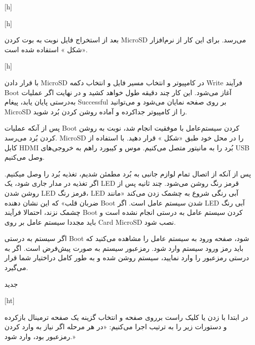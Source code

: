 [h]

[h]

بعد از استخراج فایل  ‌نوبت به بوت کردن MicroSD می‌رسد. برای این کار از نرم‌افزار  «شکل » استفاده شده است.

[h]

با قرار دادن MicroSD در کامپیوتر و انتخاب مسیر فایل و انتخاب دکمه Write فرآیند Boot آغاز می‌شود. این کار چند دقیقه طول خواهد کشید و در نهایت اگر عملیات به‌درستی پایان یابد، پیغام Successful بر روی صفحه نمایان می‌شود و می‌توانید MicroSD را از کامپیوتر جداکرده و آماده روشن کردن بُرد شوید.

پس از آنکه عملیات Boot کردن سیستم‌عامل با موفقیت انجام شد، نوبت به روشن کردن بُرد می‌رسد. MicroSD را در محل خود طبق «شکل » قرار دهید. با استفاده از کابل HDMI بُرد را به مانیتور متصل می‌کنیم. موس و کیبورد راهم به خروجی‌های USB وصل می‌کنیم.

پس از آنکه از اتصال تمام لوازم جانبی به بُرد مطمئن شدیم، تغذیه بُرد را وصل میکنیم. اگر تغذیه در مدار جاری شود، یک LED قرمز رنگ روشن می‌شود. چند ثانیه پس از روشن شدن LED قرمز رنگ، LED آبی رنگی شروع به چشمک زدن می‌کند «مانند ضربان قلب» که این نشان دهنده Boot شدن سیستم عامل است. اگر LED آبی رنگ چشمک نزند، احتمالا فرآیند Boot کردن سیستم عامل به درستی انجام نشده است و باید مجددا سیستم عامل بر روی Card MicroSD نصب شود.

اگر سیستم به درستی Boot شود، صفحه ورود به سیستم عامل را مشاهده می‌کنید که باید رمز ورود سیستم وارد شود. رمزعبور سیستم به صورت پیش‌فرض  است. اگر به درستی رمزعبور را وارد نمایید، سیستم روشن شده و به طور کامل دراختیار شما قرار می‌گیرد.

‌جدید


[ht]


در ابتدا با زدن  یا کلیک راست بر‌روی صفحه و انتخاب گزینه  یک صفحه ترمینال بازکرده و دستورات زیر را به ترتیب اجرا می‌کنیم: «در هر مرحله اگر نیاز به وارد کردن رمزعبور بود،  وارد شود.»

